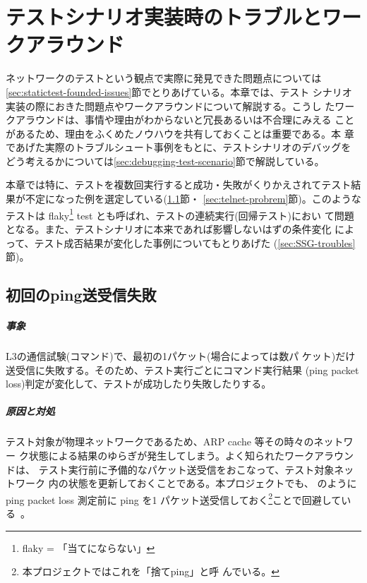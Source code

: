 
\chapter{テストシナリオ実装時のトラブルとワークアラウンド}
\label{cpt:troubles}

ネットワークのテストという観点で実際に発見できた問題点については
\ref{sec:statictest-founded-issues}節でとりあげている。本章では、テスト
シナリオ実装の際におきた問題点やワークアラウンドについて解説する。こうし
たワークアラウンドは、事情や理由がわからないと冗長あるいは不合理にみえる
ことがあるため、理由をふくめたノウハウを共有しておくことは重要である。本
章であげた実際のトラブルシュート事例をもとに、テストシナリオのデバッグを
どう考えるかについては\ref{sec:debugging-test-scenario}節で解説している。

本章では特に、テストを複数回実行すると成功・失敗がくりかえされてテスト結
果が不定になった例を選定している(\ref{sec:ping-probrem}節・
\ref{sec:telnet-probrem}節)。このようなテストは flaky\footnote{flaky =
「当てにならない」} test とも呼ばれ、テストの連続実行(回帰テスト)におい
て問題となる。また、テストシナリオに本来であれば影響しないはずの条件変化
によって、テスト成否結果が変化した事例についてもとりあげた
(\ref{sec:SSG-troubles}節)。

 \section{初回のping送受信失敗}
 \label{sec:ping-probrem}

    \paragraph{事象}
L3の通信試験(コマンド)で、最初の1パケット(場合によっては数パ
ケット)だけ送受信に失敗する。そのため、テスト実行ごとにコマンド実行結果
(ping packet loss)判定が変化して、テストが成功したり失敗したりする。

    \paragraph{原因と対処}
テスト対象が物理ネットワークであるため、ARP cache 等その時々のネットワー
ク状態による結果のゆらぎが発生してしまう。よく知られたワークアラウンドは、
テスト実行前に予備的なパケット送受信をおこなって、テスト対象ネットワーク
内の状態を更新しておくことである。本プロジェクトでも、
のように ping packet loss 測定前に ping を1
パケット送受信しておく\footnote{本プロジェクトではこれを「捨てping」と呼
んでいる。}ことで回避している~\cite{examples-pr49}。


